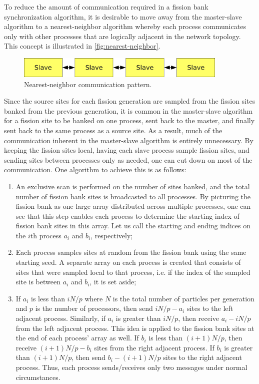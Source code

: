 To reduce the amount of communication required in a fission bank synchronization
algorithm, it is desirable to move away from the master-slave algorithm to a
nearest-neighbor algorithm whereby each process communicates only with other
processes that are logically adjacent in the network topology. This concept is
illustrated in \autoref{fig:nearest-neighbor}.
\begin{figure}[ht!]
  \centering
  \includegraphics[width=0.9\textwidth]{figures/ch3/master-slave/nearest-neighbor.pdf}
  \caption{Nearest-neighbor communication pattern.}
  \label{fig:nearest-neighbor}
\end{figure}

Since the source sites for each fission generation are sampled from the fission
sites banked from the previous generation, it is common in the master-slave
algorithm for a fission site to be banked on one process, sent back to the
master, and finally sent back to the same process as a source site. As a result,
much of the communication inherent in the master-slave algorithm is entirely
unnecessary. By keeping the fission sites local, having each slave process
sample fission sites, and sending sites between processes only as needed, one
can cut down on most of the communication. One algorithm to achieve this is as
follows:
\begin{enumerate}
\item An exclusive scan is performed on the number of sites banked, and the
  total number of fission bank sites is broadcasted to all processes. By
  picturing the fission bank as one large array distributed across multiple
  processes, one can see that this step enables each process to determine the
  starting index of fission bank sites in this array. Let us call the starting
  and ending indices on the $i$th process $a_i$ and $b_i$, respectively;
\item Each process samples sites at random from the fission bank using the same
  starting seed. A separate array on each process is created that consists of
  sites that were sampled local to that process, i.e. if the index of the
  sampled site is between $a_i$ and $b_i$, it is set aside;
\item If $a_i$ is less than $iN/p$ where $N$ is the total number of particles
  per generation and $p$ is the number of processors, then send $iN/p - a_i$
  sites to the left adjacent process. Similarly, if $a_i$ is greater than
  $iN/p$, then receive $a_i - iN/p$ from the left adjacent process. This idea is
  applied to the fission bank sites at the end of each process' array as
  well. If $b_i$ is less than $(i+1)N/p$, then receive $(i+1)N/p - b_i$ sites
  from the right adjacent process. If $b_i$ is greater than $(i+1)N/p$, then
  send $b_i - (i+1)N/p$ sites to the right adjacent process. Thus, each process
  sends/receives only two messages under normal circumstances.
\end{enumerate}

